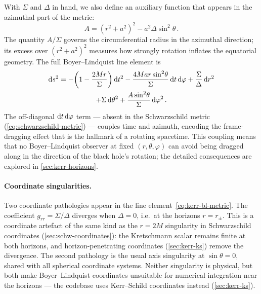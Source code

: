 With $\Sigma$ and $\Delta$ in hand, we also define an auxiliary
function that appears in the azimuthal part of the metric:
%
\begin{equation}
  A = (r^2 + a^2)^2 - a^2 \Delta \sin^2\!\theta \,.
  \label{eq:kerr-A}
\end{equation}
%
The quantity $A/\Sigma$ governs the circumferential radius in the
azimuthal direction; its excess over $(r^2 + a^2)^2$ measures
how strongly rotation inflates the equatorial geometry.  The full
Boyer--Lindquist line element is
%
\begin{multline}
  \mathrm{d} s^2 = -\!\left(1 - \frac{2Mr}{\Sigma}\right)\mathrm{d} t^2
           - \frac{4Mar\sin^2\!\theta}{\Sigma}\,\mathrm{d} t\,\mathrm{d}\varphi
           + \frac{\Sigma}{\Delta}\,\mathrm{d} r^2 \\
           + \Sigma\,\mathrm{d}\theta^2
           + \frac{A\sin^2\!\theta}{\Sigma}\,\mathrm{d}\varphi^2 \,.
  \label{eq:kerr-bl-metric}
\end{multline}
%
The off-diagonal $\mathrm{d} t\,\mathrm{d}\varphi$ term --- absent in the
Schwarzschild metric (\cref{eq:schwarzschild-metric}) --- couples time
and azimuth, encoding the frame-dragging effect that is the hallmark
of a rotating spacetime.  This coupling means that no Boyer--Lindquist
observer at fixed $(r, \theta, \varphi)$ can avoid being dragged along
in the direction of the black hole's rotation; the detailed
consequences are explored in \cref{sec:kerr-horizons}.

\paragraph{Coordinate singularities.}

Two coordinate pathologies appear in the
line element~\eqref{eq:kerr-bl-metric}.  The coefficient $g_{rr} =
\Sigma/\Delta$ diverges when $\Delta = 0$, i.e.\ at the horizons
$r = r_\pm$.  This is a coordinate artefact of the same kind as the
$r = 2M$ singularity in Schwarzschild coordinates
(\cref{sec:schw-coordinates}): the Kretschmann scalar remains finite
at both horizons, and horizon-penetrating coordinates
(\cref{sec:kerr-ks}) remove the divergence.  The second pathology is
the usual axis singularity at $\sin\theta = 0$, shared with all
spherical coordinate systems.  Neither singularity is physical, but
both make Boyer--Lindquist coordinates unsuitable for numerical
integration near the horizons --- the codebase uses Kerr--Schild
coordinates instead (\cref{sec:kerr-ks}).

